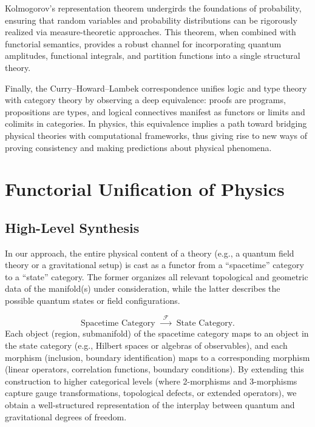 \documentclass[12pt]{article}
\begin{document}
Kolmogorov’s representation theorem \cite{Kolmogorov1933} undergirds the foundations of probability, ensuring that random variables and probability distributions can be rigorously realized via measure-theoretic approaches. This theorem, when combined with functorial semantics, provides a robust channel for incorporating quantum amplitudes, functional integrals, and partition functions into a single structural theory.

Finally, the Curry--Howard--Lambek correspondence \cite{Curry1934,Howard1980,Lambek1980} unifies logic and type theory with category theory by observing a deep equivalence: proofs are programs, propositions are types, and logical connectives manifest as functors or limits and colimits in categories. In physics, this equivalence implies a path toward bridging physical theories with computational frameworks, thus giving rise to new ways of proving consistency and making predictions about physical phenomena.

\section{Functorial Unification of Physics}
\subsection{High-Level Synthesis}
In our approach, the entire physical content of a theory (e.g., a quantum field theory or a gravitational setup) is cast as a functor from a ``spacetime'' category to a ``state'' category. The former organizes all relevant topological and geometric data of the manifold(s) under consideration, while the latter describes the possible quantum states or field configurations.

\[
\text{Spacetime Category} \;\xrightarrow{\;\;\mathcal{F}\;\;}\; \text{State Category}.
\]
Each object (region, submanifold) of the spacetime category maps to an object in the state category (e.g., Hilbert spaces or algebras of observables), and each morphism (inclusion, boundary identification) maps to a corresponding morphism (linear operators, correlation functions, boundary conditions). By extending this construction to higher categorical levels (where 2-morphisms and 3-morphisms capture gauge transformations, topological defects, or extended operators), we obtain a well-structured representation of the interplay between quantum and gravitational degrees of freedom.
\end{document}
